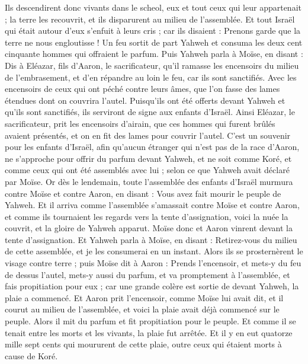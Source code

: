\begin{multicols}{2}
Ils descendirent donc vivants dans le scheol, eux et tout ceux qui leur appartenait ; la terre les recouvrit, et ils disparurent au milieu de l'assemblée.
Et tout Israël qui était autour d'eux s'enfuit à leurs cris ; car ils disaient : Prenons garde que la terre ne nous engloutisse !
Un feu sortit de part Yahweh et consuma les deux cent cinquante hommes qui offraient le parfum.
Puis Yahweh parla à Moïse, en disant :
Dis à Eléazar, fils d'Aaron, le sacrificateur, qu'il ramasse les encensoirs du milieu de l'embrasement, et d'en répandre au loin le feu, car ils sont sanctifiés.
Avec les encensoirs de ceux qui ont péché contre leurs âmes, que l'on fasse des lames étendues dont on couvrira l'autel. Puisqu'ils ont été offerts devant Yahweh et qu'ils sont sanctifiés, ils serviront de signe aux enfants d'Israël.
Ainsi Eléazar, le sacrificateur, prit les encensoirs d'airain, que ces hommes qui furent brûlés avaient présentés, et on en fit des lames pour couvrir l'autel.
C'est un souvenir pour les enfants d'Israël, afin qu'aucun étranger qui n'est pas de la race d'Aaron, ne s'approche pour offrir du parfum devant Yahweh, et ne soit comme Koré, et comme ceux qui ont été assemblés avec lui ; selon ce que Yahweh avait déclaré par Moïse.
Or dès le lendemain, toute l'assemblée des enfants d'Israël murmura contre Moïse et contre Aaron, en disant : Vous avez fait mourir le peuple de Yahweh.
Et il arriva comme l'assemblée s'amassait contre Moïse et contre Aaron, et comme ils tournaient les regards vers la tente d'assignation, voici la nuée la couvrit, et la gloire de Yahweh apparut.
Moïse donc et Aaron vinrent devant la tente d'assignation.
Et Yahweh parla à Moïse, en disant :
Retirez-vous du milieu de cette assemblée, et je les consumerai en un instant. Alors ils se prosternèrent le visage contre terre ;
puis Moïse dit à Aaron : Prends l'encensoir, et mets-y du feu de dessus l'autel, mets-y aussi du parfum, et va promptement à l'assemblée, et fais propitiation pour eux ; car une grande colère est sortie de devant Yahweh, la plaie a commencé.
Et Aaron prit l'encensoir, comme Moïse lui avait dit, et il courut au milieu de l'assemblée, et voici la plaie avait déjà commencé sur le peuple. Alors il mit du parfum et fit propitiation pour le peuple.
Et comme il se tenait entre les morts et les vivants, la plaie fut arrêtée.
Et il y en eut quatorze mille sept cents qui moururent de cette plaie, outre ceux qui étaient morts à cause de Koré.

\end{multicols}
